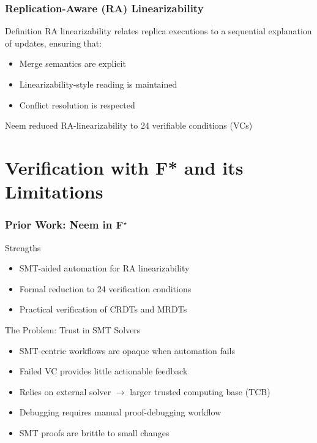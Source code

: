 \documentclass[usepdftitle=false]{beamer}
\newcommand{\fstar}{F$^{\star}$\xspace}
\begin{document}
\begin{frame}
  \frametitle{Replication-Aware (RA) Linearizability}
  
  \begin{block}{Definition}
    RA linearizability relates replica executions to a sequential explanation of updates, ensuring that:
    \begin{itemize}
      \item Merge semantics are explicit
      \item Linearizability-style reading is maintained
      \item Conflict resolution is respected
    \end{itemize}
  \end{block}
  
  \vspace{0.3cm}
  Neem reduced RA-linearizability to 24 verifiable conditions (VCs)
\end{frame}

\section{Verification with F* and its Limitations}

\begin{frame}
  \frametitle{Prior Work: Neem in \fstar}
  
  \begin{block}{Strengths}
    \begin{itemize}
      \item SMT-aided automation for RA linearizability
      \item Formal reduction to 24 verification conditions
      \item Practical verification of CRDTs and MRDTs
    \end{itemize}
  \end{block}
  
  \vspace{0.3cm}
  \begin{block}{The Problem: Trust in SMT Solvers}
    \begin{itemize}
      \item SMT-centric workflows are opaque when automation fails
      \item Failed VC provides little actionable feedback
      \item Relies on external solver $\rightarrow$ larger trusted computing base (TCB)
      \item Debugging requires manual proof-debugging workflow
      \item SMT proofs are brittle to small changes
    \end{itemize}
  \end{block}
\end{frame}
\end{document}
